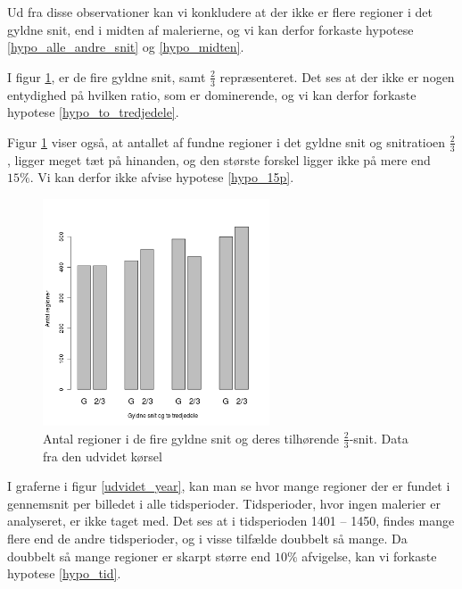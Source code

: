 {Ud fra disse observationer kan vi konkludere at der ikke er flere
regioner i det gyldne snit, end i midten af malerierne, og vi kan derfor
forkaste hypotese \ref{hypo_alle_andre_snit} og \ref{hypo_midten}.

I figur \ref{G_vs_to_trejedele_udvidet}, er de fire gyldne snit, samt
$\frac{2}{3}$ repræsenteret. Det ses at der ikke er nogen entydighed på
hvilken ratio, som er dominerende, og vi kan derfor forkaste hypotese
\ref{hypo_to_tredjedele}.

Figur \ref{G_vs_to_trejedele_udvidet} viser også, at antallet af fundne
regioner i det gyldne snit og snitratioen $\frac{2}{3}$, ligger meget
tæt på hinanden, og den største forskel ligger ikke på mere end $15\%$.
Vi kan derfor ikke afvise hypotese \ref{hypo_15p}.

\begin{figure}[h!]
	\begin{center}
		\includegraphics[width=0.6\textwidth]{afsnit/resultater/billeder/G_vs_to_tredjedeleU.png}
	\end{center}
	\caption{Antal regioner i de fire gyldne snit og deres
    tilhørende $\frac{2}{3}$-snit. Data fra den udvidet kørsel}
	\label{G_vs_to_trejedele_udvidet}
\end{figure}

I graferne i figur \ref{udvidet_year}, kan man se hvor mange regioner
der er fundet i gennemsnit per billedet i alle tidsperioder.
Tidsperioder, hvor ingen malerier er analyseret, er ikke taget med. Det
ses at i tidsperioden 1401 -- 1450, findes mange flere end de andre
tidsperioder, og i visse tilfælde doubbelt så mange. Da doubbelt så
mange regioner er skarpt større end $10\%$ afvigelse, kan vi forkaste
hypotese \ref{hypo_tid}.

}
